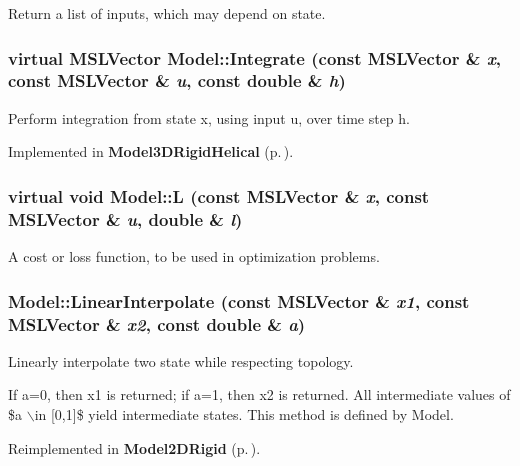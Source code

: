 Return a list of inputs, which may depend on state.

\subsubsection{\setlength{\rightskip}{0pt plus 5cm}virtual {\bf MSLVector} Model::Integrate (const {\bf MSLVector} \& {\em x}, const {\bf MSLVector} \& {\em u}, const double \& {\em h})\hspace{0.3cm}{\tt  [pure virtual]}}\label{classModel_a5}


Perform integration from state x, using input u, over time step h.



Implemented in {\bf Model3DRigid\-Helical} {\rm (p.\,\pageref{classModel3DRigidHelical_a3})}.
\subsubsection{\setlength{\rightskip}{0pt plus 5cm}virtual void Model::L (const {\bf MSLVector} \& {\em x}, const {\bf MSLVector} \& {\em u}, double \& {\em l})\hspace{0.3cm}{\tt  [inline, virtual]}}\label{classModel_a12}


A cost or loss function, to be used in optimization problems.

\subsubsection{ Model::Linear\-Interpolate (const {\bf MSLVector} \& {\em x1}, const {\bf MSLVector} \& {\em x2}, const double \& {\em a})\hspace{0.3cm}{\tt  [virtual]}}\label{classModel_a6}


Linearly interpolate two state while respecting topology.

If a=0, then x1 is returned; if a=1, then x2 is returned. All intermediate values of \$a $\backslash$in [0,1]\$ yield intermediate states. This method is defined by Model. 

Reimplemented in {\bf Model2DRigid} {\rm (p.\,\pageref{classModel2DRigid_a4})}.
